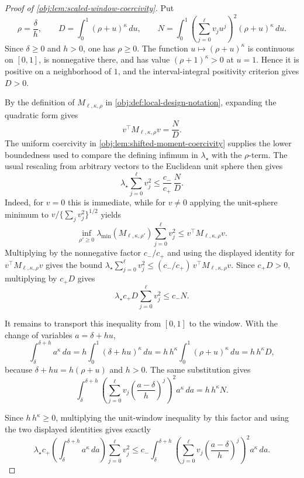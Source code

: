 \documentclass[11pt]{article}
\begin{document}
\begin{proof}[Proof of \cref{obj:lem:scaled-window-coercivity}]
Put
\[
\rho=\frac{\delta}{h},\qquad
D=\int_0^1(\rho+u)^\kappa\,du,\qquad
N=\int_0^1
\left(\sum_{j=0}^{\ell}v_j u^j\right)^2(\rho+u)^\kappa\,du .
\]
Since \(\delta\ge0\) and \(h>0\), one has \(\rho\ge0\).  The function
\(u\mapsto(\rho+u)^\kappa\) is continuous on \([0,1]\), is nonnegative there, and has value \((\rho+1)^\kappa>0\) at \(u=1\).  Hence it is positive on a neighborhood of \(1\), and the interval-integral positivity criterion gives \(D>0\).

By the definition of \(M_{\ell,\kappa,\rho}\) in \cref{obj:def:local-design-notation}, expanding the quadratic form gives
\[
v^\top M_{\ell,\kappa,\rho}v=\frac{N}{D}.
\]
The uniform coercivity in \cref{obj:lem:shifted-moment-coercivity} supplies the lower boundedness used to compare the defining infimum in \(\lambda_\star\) with the \(\rho\)-term.  The usual rescaling from arbitrary vectors to the Euclidean unit sphere then gives
\[
\lambda_\star\sum_{j=0}^{\ell}v_j^2
\le
\frac{c_-}{c_+}\,
\frac{N}{D}.
\]
Indeed, for \(v=0\) this is immediate, while for \(v\ne0\) applying the unit-sphere minimum to
\(v/\{\sum_jv_j^2\}^{1/2}\) yields
\[
\inf_{\rho'\ge0}\lambda_{\min}(M_{\ell,\kappa,\rho'})
\sum_{j=0}^{\ell}v_j^2
\le
v^\top M_{\ell,\kappa,\rho}v .
\]
Multiplying by the nonnegative factor \(c_-/c_+\) and using the displayed identity for \(v^\top M_{\ell,\kappa,\rho}v\) gives the bound
\(\lambda_\star\sum_{j=0}^{\ell}v_j^2\le(c_-/c_+)\,v^\top M_{\ell,\kappa,\rho}v\).  Since \(c_+D>0\), multiplying by \(c_+D\) gives
\[
\lambda_\star c_+D\sum_{j=0}^{\ell}v_j^2
\le c_-N .
\]

It remains to transport this inequality from \([0,1]\) to the window.  With the change of variables
\(a=\delta+hu\),
\[
\int_{\delta}^{\delta+h}a^\kappa\,da
=
h\int_0^1(\delta+hu)^\kappa\,du
=
h\,h^\kappa
\int_0^1(\rho+u)^\kappa\,du
=
h\,h^\kappa D,
\]
because \(\delta+hu=h(\rho+u)\) and \(h>0\).  The same substitution gives
\[
\int_{\delta}^{\delta+h}
\left(\sum_{j=0}^{\ell}v_j\left(\frac{a-\delta}{h}\right)^j\right)^2
a^\kappa\,da
=
h\,h^\kappa N .
\]

Since \(h\,h^\kappa\ge0\), multiplying the unit-window inequality by this factor and using the two displayed identities gives exactly
\[
\lambda_\star c_+
\left(\int_{\delta}^{\delta+h}a^\kappa\,da\right)
\sum_{j=0}^{\ell}v_j^2
\le
c_-
\int_{\delta}^{\delta+h}
\left(\sum_{j=0}^{\ell}
v_j\left(\frac{a-\delta}{h}\right)^j\right)^2
a^\kappa\,da .
\]
\end{proof}
\end{document}
